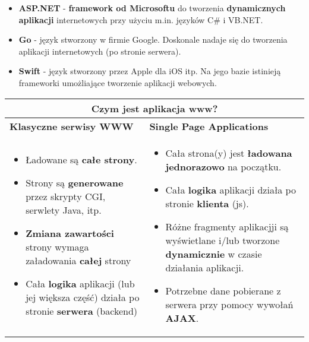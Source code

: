 \documentclass[../main.tex]{subfiles}
\begin{document}
\begin{itemize}
\begin{itemize}
            \item \textbf{ASP.NET} - \textbf{framework od Microsoftu} do tworzenia \textbf{dynamicznych aplikacji} internetowych przy użyciu m.in. języków C\# i VB.NET.
            \item \textbf{Go} - język stworzony w firmie Google. Doskonale nadaje się do tworzenia aplikacji internetowych (po stronie serwera).
            \item \textbf{Swift} - język stworzony przez Apple dla iOS itp. Na jego bazie istinieją frameworki umożliające tworzenie aplikacji webowych.
        \end{itemize}
    \end{itemize}

    \begin{table}[H]
        \begin{center}
            \begin{tabular}{|p{7.5cm}|p{8.5cm}|}
                \hline
                \multicolumn{2}{|c|}{\textbf{Czym jest aplikacja www?}}\\
                \hline
                \textbf{Klasyczne serwisy WWW} & \textbf{Single Page Applications}\\
                \hline
                \hline
                \begin{itemize}
                    \item Ładowane są \textbf{całe strony}.
                    \item Strony są \textbf{generowane} przez skrypty CGI, serwlety Java, itp.
                    \item \textbf{Zmiana zawartości} strony wymaga załadowania \textbf{całej} strony
                    \item Cała \textbf{logika} aplikacji (lub jej większa część) działa po stronie \textbf{serwera} (backend)
                \end{itemize}
                &
                \begin{itemize}
                    \item Cała strona(y) jest \textbf{ładowana jednorazowo} na początku.
                    \item Cała \textbf{logika} aplikacji działa po stronie \textbf{klienta} (js).
                    \item Różne fragmenty aplikacjji są wyświetlane i/lub tworzone \textbf{dynamicznie} w czasie działania aplikacji.
                    \item Potrzebne dane pobierane z serwera przy pomocy wywołań \textbf{AJAX}.
                \end{itemize}\\
                \hline
            \end{tabular}
        \end{center}
    \end{table}
\end{document}
